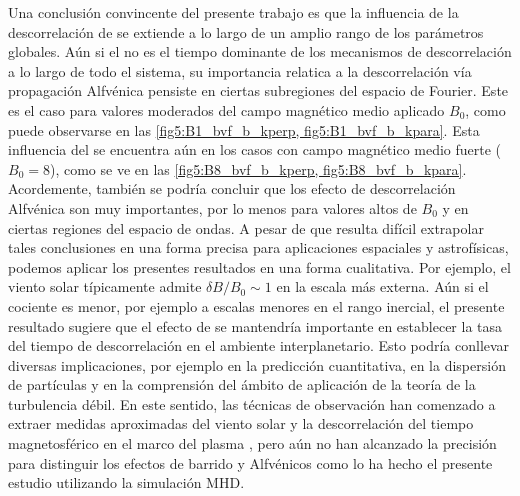 Una conclusión convincente del presente trabajo es que la influencia
de la descorrelación de \sweeping se extiende a lo largo de un amplio
rango de los parámetros globales. Aún si el \sweeping no es el tiempo
dominante de los mecanismos de descorrelación a lo largo de todo el
sistema, su importancia relatica a la descorrelación vía propagación
Alfvénica pensiste en ciertas subregiones del espacio de Fourier.
Este es el caso para valores moderados del campo magnético medio
aplicado $B_0$, como puede observarse en las
\cref{fig5:B1_bvf_b_kperp, fig5:B1_bvf_b_kpara}. Esta influencia del
\sweeping se encuentra aún en los casos con campo magnético medio
fuerte ($B_0 = 8$), como se ve en las \cref{fig5:B8_bvf_b_kperp,
  fig5:B8_bvf_b_kpara}. Acordemente, también se podría concluir que
los efecto de descorrelación Alfvénica son muy importantes, por lo
menos para valores altos de $B_0$ y en ciertas regiones del espacio de
ondas.  A pesar de que resulta difícil extrapolar tales conclusiones
en una forma precisa para aplicaciones espaciales y astrofísicas,
podemos aplicar los presentes resultados en una forma cualitativa.
Por ejemplo, el viento solar típicamente admite $\delta B/B_0 \sim 1$
en la escala más externa.  Aún si el cociente es menor, por ejemplo a
escalas menores en el rango inercial, el presente resultado sugiere
que el efecto de \sweeping se mantendría importante en establecer la
tasa del tiempo de descorrelación en el ambiente interplanetario. Esto
podría conllevar diversas implicaciones, por ejemplo en la predicción
cuantitativa, en la dispersión de partículas y en la comprensión del
ámbito de aplicación de la teoría de la turbulencia débil. En este
sentido, las técnicas de observación han comenzado a extraer medidas
aproximadas del viento solar y la descorrelación del tiempo
magnetosférico en el marco del plasma
\cite{matthaeus_ensemble_2016,weygand_magnetic_2013}, pero aún no han
alcanzado la precisión para distinguir los efectos de barrido y
Alfvénicos como lo ha hecho el presente estudio utilizando la
simulación MHD.

